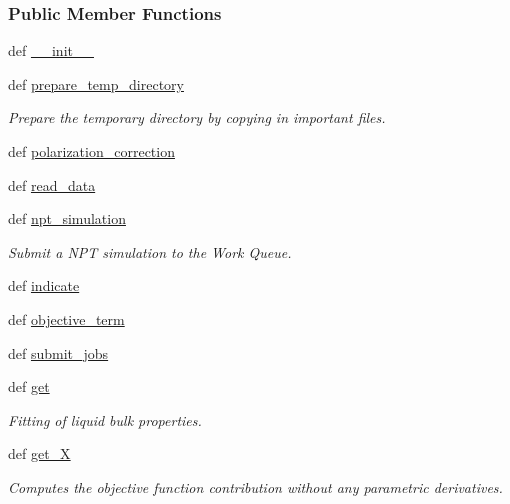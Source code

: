 \subsubsection*{Public Member Functions}
\begin{DoxyCompactItemize}
\item 
def \hyperlink{classforcebalance_1_1gmxio_1_1Liquid__GMX_a858330327e84a1186b9a932fe2437489}{\-\_\-\-\_\-init\-\_\-\-\_\-}
\item 
def \hyperlink{classforcebalance_1_1gmxio_1_1Liquid__GMX_a499a65278055bae95d3789ed74f6dc60}{prepare\-\_\-temp\-\_\-directory}
\begin{DoxyCompactList}\small\item\em Prepare the temporary directory by copying in important files. \end{DoxyCompactList}\item 
def \hyperlink{classforcebalance_1_1gmxio_1_1Liquid__GMX_a70a950655df19e6ed0365ba873fd0cc5}{polarization\-\_\-correction}
\item 
def \hyperlink{classforcebalance_1_1liquid_1_1Liquid_a08b698af913d56f780d0587821c922cd}{read\-\_\-data}
\item 
def \hyperlink{classforcebalance_1_1liquid_1_1Liquid_a07a59f9f335693329b789a9c7608fc9f}{npt\-\_\-simulation}
\begin{DoxyCompactList}\small\item\em Submit a N\-P\-T simulation to the Work Queue. \end{DoxyCompactList}\item 
def \hyperlink{classforcebalance_1_1liquid_1_1Liquid_ae94ce30dfd0e92fdd6d746e6743be844}{indicate}
\item 
def \hyperlink{classforcebalance_1_1liquid_1_1Liquid_a00c23db61bcb86cc19f79dacdb2bc1f3}{objective\-\_\-term}
\item 
def \hyperlink{classforcebalance_1_1liquid_1_1Liquid_a716e28bb5572b3273036ac753b7e1e1d}{submit\-\_\-jobs}
\item 
def \hyperlink{classforcebalance_1_1liquid_1_1Liquid_a802c4139e5c002fabdeab5de88093880}{get}
\begin{DoxyCompactList}\small\item\em Fitting of liquid bulk properties. \end{DoxyCompactList}\item 
def \hyperlink{classforcebalance_1_1target_1_1Target_a606dd136f195c267c05a2455405e5949}{get\-\_\-\-X}
\begin{DoxyCompactList}\small\item\em Computes the objective function contribution without any parametric derivatives. \end{DoxyCompactList}\item 

\end{DoxyCompactItemize}

